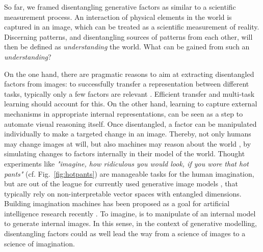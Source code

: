 	So far, we framed disentangling generative factors as similar to a scientific measurement process. An interaction of physical elements in the world is captured in an image, which can be treated as a scientific measurement of reality. Discerning patterns, and disentangling sources of patterns from each other, will then be defined as \textit{understanding} the world. What can be gained from such an \textit{understanding}?

	On the one hand, there are pragmatic reasons to aim at extracting disentangled factors from images: to successfully transfer a representation between different tasks, typically only a few factors are relevant \cite{bengio13rep}.
	Efficient transfer and multi-task learning should account for this.
	On the other hand, learning to capture external mechanisms in appropriate internal representations, can be seen as a step to automate visual reasoning itself.
	Once disentangled, a factor can be manipulated individually to make a targeted change in an image. Thereby, not only humans may change images at will, but also machines may reason about the world \cite{pearl18impediments}, by simulating changes to factors internally in their model of the world.
	Thought experiments like \textit{"imagine, how ridiculous you would look, if you wore that hot pants"} (cf. Fig.~\ref{fig:hotpants}) are manageable tasks for the human imagination, but are out of the league for currently used generative image models \cite{goodfellow14gan, kingma13vae}, that typically rely on non-interpretable vector spaces with entangled dimensions.
	Building imagination machines has been proposed as a goal for artificial intelligence research recently \cite{mahadevan18imagine}.
	To imagine, is to manipulate of an internal model to generate internal images.
	In this sense, in the context of generative modelling, disentangling factors could as well lead the way from a science of images to a science of imagination.

